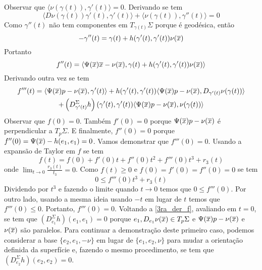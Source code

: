 Observar que $ \langle \nu(\gamma(t)), \gamma'(t) \rangle = 0 $. Derivando se tem
\begin{equation*}	\langle D \nu(\gamma(t)) \gamma'(t), \gamma'(t) \rangle + \langle \nu(\gamma(t)), \gamma''(t) \rangle = 0
\end{equation*}
Como $\gamma''(t)$ não tem componentes em $T_{\gamma(t)} \Sigma$ porque é geodésica, então
\begin{equation*}
	-\gamma''(t) = \gamma(t) + h(\gamma'(t), \gamma'(t)) \nu(\overline{x})
\end{equation*}
Portanto
\begin{equation*}
	f''(t) = \langle \Psi(\overline{x}) \overline{x} - \nu(\overline{x}), \gamma(t) + h(\gamma'(t), \gamma'(t)) \nu(\overline{x}) \rangle
\end{equation*}
Derivando outra vez se tem
\begin{multline}\label{3ra_der_f}
	f'''(t) = \langle \Psi(\overline{x})p - \nu(\overline{x}), \gamma'(t) \rangle + h(\gamma'(t), \gamma'(t)) \langle \Psi(\overline{x})p - \nu(\overline{x}), D_{\gamma'(t)} \nu(\gamma(t)) \rangle\\
	+ \left( D_{\gamma'(t)}^{\Sigma} h \right) (\gamma'(t), \gamma'(t)) \langle \Psi(\overline{x})p - \nu(\overline{x}), \nu(\gamma(t)) \rangle
\end{multline}
Observar que $f(0)=0$. Também $f'(0)=0$ porque $\Psi(\overline{x})p - \nu(\overline{x})$ é perpendicular a $T_p \Sigma$. E finalmente, $f''(0)=0$ porque $f''(0) = \Psi(\overline{x}) - h(e_1,e_1)=0$.
Vamos demonstrar que $f'''(0)=0$. Usando a expansão de Taylor em $f$ se tem
\begin{equation*}
	f(t) = f(0) + f'(0)t + f''(0)t^2 + f'''(0)t^3 + r_3(t)
\end{equation*}  
onde $\lim_{t \rightarrow 0} \frac{r_3(t)}{t_3}=0$. Como $f(t) \geq 0$ e $f(0)=f'(0)=f''(0)=0$ se tem
\begin{equation*}
	0 \leq f'''(0) t^3 + r_3(t)
\end{equation*}
Dividendo por $t^3$ e fazendo o limite quando $t \rightarrow 0$ temos que $0 \leq f'''(0)$. Por outro lado, usando a mesma ideia usando $-t$ em lugar de  $t$ temos que $f'''(0) \leq 0$. Portanto, $f'''(0)=0$.
Voltando  a \eqref{3ra_der_f}, avaliando em $t=0$, se tem que $(D_{e_1}^{\Sigma} h) (e_1,e_1) = 0$ porque $e_1, D_{e_1} \nu(\overline{x}) \in T_p \Sigma$ e $\Psi(\overline{x})p - \nu(\overline{x})$ e $\nu(\overline{x})$ são paralelos.
Para continuar a demonstração deste primeiro caso, podemos considerar a base $\{ e_2, e_1, -\nu \}$ em lugar de $\{ e_1, e_2, \nu \}$ para mudar a orientação definida da superfície e, fazendo o mesmo procedimento, se tem que $(D_{e_2}^{\Sigma} h) (e_2,e_2)=0$.
